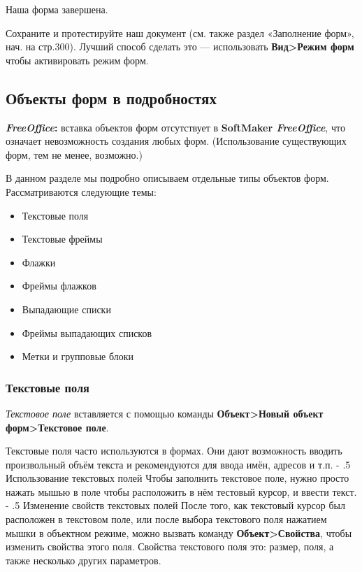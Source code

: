 ﻿\documentclass[a4paper,10pt]{article}
\makeatletter
\renewcommand\paragraph{%
   \@startsection{paragraph}{4}{0mm}%
      {-\baselineskip}%
      {.5\baselineskip}%
      {\normalfont\normalsize\bfseries}}
\makeatother
\begin{document}
Наша форма завершена.

Сохраните и протестируйте наш документ (см. также раздел «Заполнение форм», нач. на стр.300). Лучший способ сделать это — использовать \textbf{Вид>Режим форм} чтобы активировать режим форм.
 
\subsection{Объекты форм в подробностях}
\begin{mdframed}[backgroundcolor=pink!50]
\textbf{\textit{FreeOffice}:} вставка объектов форм отсутствует в \textbf{SoftMaker \textit{FreeOffice}}, что означает невозможность создания любых форм. (Использование существующих форм, тем не менее, возможно.)
\end{mdframed}

В данном разделе мы подробно описываем отдельные типы объектов форм. Рассматриваются следующие темы:
\begin{itemize}
 \item Текстовые поля
 \item Текстовые фреймы
 \item Флажки
 \item Фреймы флажков
 \item Выпадающие списки
 \item Фреймы выпадающих списков
 \item Метки и групповые блоки
\end{itemize}

\subsubsection{Текстовые поля}
\textit{Текстовое поле} вставляется с помощью команды \textbf{Объект>Новый объект форм>Текстовое поле}.

Текстовые поля часто используются в формах. Они дают возможность вводить произвольный объём текста и рекомендуются для ввода имён, адресов и т.п.
\paragraph{Использование текстовых полей}
Чтобы заполнить текстовое поле, нужно просто нажать мышью в поле чтобы расположить в нём тестовый курсор, и ввести текст.
\paragraph{Изменение свойств текстовых полей}
После того, как текстовый курсор был расположен в текстовом поле, или после выбора текстового поля нажатием мышки в объектном режиме, можно вызвать команду \textbf{Объект>Свойства}, чтобы изменить свойства этого поля. Свойства текстового поля это: размер, поля, а также несколько других параметров.
\end{document}
